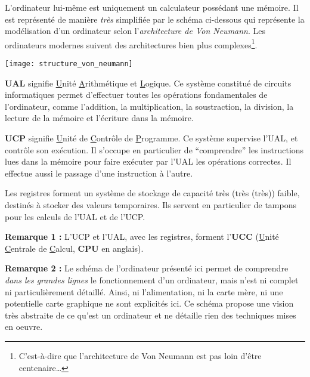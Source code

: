 \documentclass[../../main.tex]{subfiles}
\begin{document}
L'ordinateur lui-même est uniquement un calculateur possédant une mémoire. Il est représenté de manière \textit{très} simplifiée par le schéma ci-dessous qui représente la modélisation d'un ordinateur selon l'\textit{architecture de Von Neumann}. Les ordinateurs modernes suivent des architectures bien plus complexes\footnote{C'est-à-dire que l'architecture de Von Neumann est pas loin d'être centenaire\dots}.
\begin{center}
  \texttt{[image: structure\_von\_neumann]}
\end{center}
\textbf{UAL} signifie \underline{U}nité \underline{A}rithmétique et \underline{L}ogique. Ce système constitué de circuits informatiques permet d'effectuer toutes les opérations fondamentales de l'ordinateur, comme l'addition, la multiplication, la soustraction, la division, la lecture de la mémoire et l'écriture dans la mémoire.

\textbf{UCP} signifie \underline{U}nité de \underline{C}ontrôle de \underline{P}rogramme. Ce système supervise l'UAL, et contrôle son exécution. Il s'occupe en particulier de ``comprendre'' les instructions lues dans la mémoire pour faire exécuter par l'UAL les opérations correctes. Il effectue aussi le passage d'une instruction à l'autre.

Les registres forment un système de stockage de capacité très (très (très)) faible, destinés à stocker des valeurs temporaires. Ils servent en particulier de tampons pour les calculs de l'UAL et de l'UCP.

\textbf{Remarque 1 :} L'UCP et l'UAL, avec les registres, forment l'\textbf{UCC} (\underline{U}nité \underline{C}entrale de \underline{C}alcul, \textbf{CPU} en anglais).

\textbf{Remarque 2 :} Le schéma de l'ordinateur présenté ici permet de comprendre \textit{dans les grandes lignes} le fonctionnement d'un ordinateur, mais n'est ni complet ni particulièrement détaillé. Ainsi, ni l'alimentation, ni la carte mère, ni une potentielle carte graphique ne sont explicités ici. Ce schéma propose une vision très abstraite de ce qu'est un ordinateur et ne détaille rien des techniques mises en oeuvre.
\end{document}
